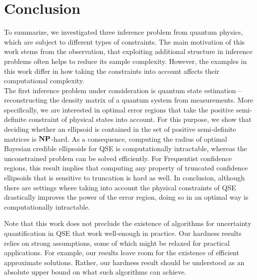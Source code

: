 
\chapter{Conclusion}%
\label{chap:conclusion}

To summarize, we investigated three inference problem from quantum physics, which are subject to different types of constraints.
The main motivation of this work stems from the observation, that exploiting additional structure in inference problems often helps to reduce its sample complexity.
However, the examples in this work differ in how taking the constraints into account affects their computational complexity.\\



The first inference problem under consideration is quantum state estimation -- reconstructing the density matrix of a quantum system from measurements.
More specifically, we are interested in optimal error regions that take the positive semi-definite constraint of physical states into account.
For this purpose, we show that deciding whether an ellipsoid is contained in the set of positive semi-definite matrices is $\mathbf{NP}$-hard.
As a consequence, computing the radius of optimal Bayesian credible ellipsoids for QSE is computationally intractable, whereas the unconstrained problem can be solved efficiently.
For Frequentist confidence regions, this result implies that computing any property of truncated confidence ellipsoids that is sensitive to truncation is hard as well.
In conclusion, although there are settings where taking into account the physical constraints of QSE drastically improves the power of the error region, doing so in an optimal way is computationally intractable.

Note that this work does not preclude the existence of algorithms for uncertainty quantification in QSE that work well-enough in practice.
Our hardness results relies on strong assumptions, some of which might be relaxed for practical applications.
For example, our results leave room for the existence of efficient approximate solutions.
Rather, our hardness result should be understood as an absolute upper bound on what such algorithms can achieve.\\



